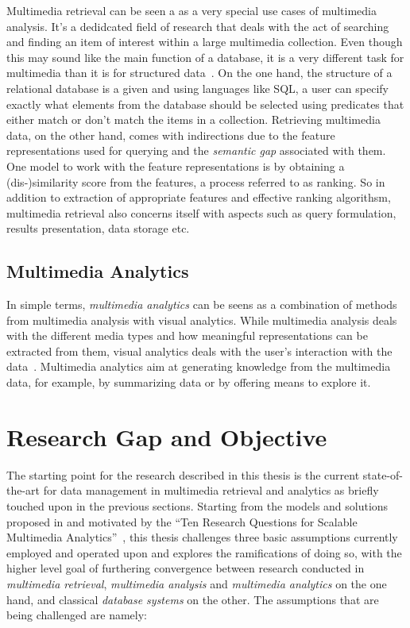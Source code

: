 Multimedia retrieval can be seen a as a very special use cases of multimedia analysis. It's a dedidcated field of research that deals with the act of searching and finding an item of interest within a large multimedia collection. Even though this may sound like the main function of a database, it is a very different task for multimedia than it is for structured data~\cite{Blanken:2007multimedia}. On the one hand, the structure of a relational database is a given and using languages like SQL, a user can specify exactly what elements from the database should be selected using predicates that either match or don't match the items in a collection. Retrieving multimedia data, on the other hand, comes with indirections due to the feature representations used for querying and the \emph{semantic gap} associated with them. One model to work with the feature representations is by obtaining a (dis-)similarity score from the features, a process referred to as ranking. So in addition to extraction of appropriate features and effective ranking algorithsm, multimedia retrieval also concerns itself with aspects such as query formulation, results presentation, data storage etc.

\subsection{Multimedia Analytics}
In simple terms, \emph{multimedia analytics} can be seens as a combination of methods from multimedia analysis with visual analytics. While multimedia analysis deals with the different media types and how meaningful representations can be extracted from them, visual analytics deals with the user's interaction with the data~\cite{Chinchor:2010multimedia}. Multimedia analytics aim at generating knowledge from the multimedia data, for example, by summarizing data or by offering means to explore it.


\section{Research Gap and Objective}

The starting point for the research described in this thesis is the current state-of-the-art for data management in multimedia retrieval and analytics as briefly touched upon in the previous sections. Starting from the models and solutions proposed in \cite{Giangreco:2016adam,Giangreco:2018thesis} and motivated by the ``Ten Research Questions for Scalable Multimedia Analytics''~\cite{Jonson:2016}, this thesis challenges three basic assumptions currently employed and operated upon and explores the ramifications of doing so, with the higher level goal of furthering convergence between research conducted in \emph{multimedia retrieval}, \emph{multimedia analysis} and \emph{multimedia analytics} on the one hand, and classical \emph{database systems} on the other. The assumptions that are being challenged are namely:

